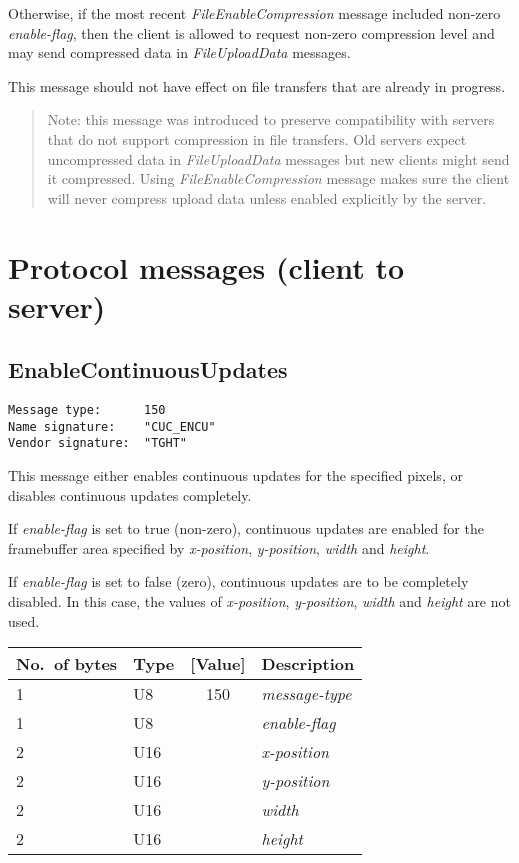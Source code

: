 \documentclass[a4paper]{article}
\newcommand{\typestr}[1]{\textit{#1}}
\begin{document}
Otherwise, if the most recent \typestr{FileEnableCompression} message
included non-zero \typestr{enable-flag}, then the client is allowed to
request non-zero compression level and may send compressed data in
\typestr{FileUploadData} messages.

This message should not have effect on file transfers that are already
in progress.

\begin{quote}
Note: this message was introduced to preserve compatibility with
servers that do not support compression in file transfers. Old servers
expect uncompressed data in \typestr{FileUploadData} messages but new
clients might send it compressed. Using
\typestr{FileEnableCompression} message makes sure the client will
never compress upload data unless enabled explicitly by the server.
\end{quote}

\newpage
\section{Protocol messages (client to server)}

\subsection{EnableContinuousUpdates}
\begin{verbatim}
Message type:      150
Name signature:    "CUC_ENCU"
Vendor signature:  "TGHT"
\end{verbatim}

This message either enables continuous updates for the specified
pixels, or disables continuous updates completely.

If \typestr{enable-flag} is set to true (non-zero), continuous updates
are enabled for the framebuffer area specified by
\typestr{x-position}, \typestr{y-position}, \typestr{width} and
\typestr{height}.

If \typestr{enable-flag} is set to false (zero), continuous updates
are to be completely disabled. In this case, the values of
\typestr{x-position}, \typestr{y-position}, \typestr{width} and
\typestr{height} are not used.

\begin{tabular}{l|lc|l} \hline
No.\ of bytes & Type & [Value] & Description \\ \hline
1 & U8  & 150 & \typestr{message-type} \\
1 & U8  &     & \typestr{enable-flag} \\
2 & U16 &     & \typestr{x-position} \\
2 & U16 &     & \typestr{y-position} \\
2 & U16 &     & \typestr{width} \\
2 & U16 &     & \typestr{height} \\
\hline\end{tabular}
\end{document}
